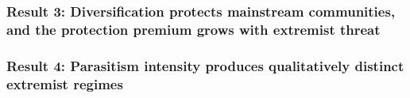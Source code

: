 \documentclass[12pt]{article}
\begin{document}
\subsubsection{Result 3: Diversification protects mainstream communities, and the protection premium grows with extremist threat}

%
%
%
%

\subsubsection{Result 4: Parasitism intensity produces qualitatively distinct extremist regimes}

%
%
%
%
%
\end{document}
